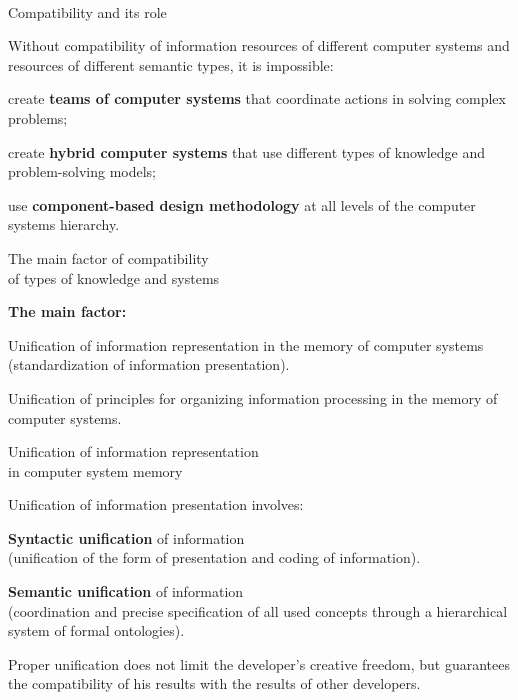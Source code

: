 \begin{frame}{\\Compatibility and its role}
	\topline
	\justifying
	
	Without compatibility of information resources of different computer systems and resources of different semantic types, it is impossible:
	\begin{textitemize}
		\item create \textbf{teams of computer systems} that coordinate actions in solving complex problems;
		\item create \textbf{hybrid computer systems} that use different types of knowledge and problem-solving models;
		\item use \textbf{component-based design methodology} at all levels of the computer systems hierarchy.
	\end{textitemize}
	
\end{frame}


\begin{frame}{The main factor of compatibility\\of types of knowledge and systems}
	\topline
	\justifying
	
	\textbf{The main factor:}
	\begin{textitemize}
		\item Unification of information representation in the memory of computer systems
		(standardization of information presentation).
		\item Unification of principles for organizing information processing in the memory of computer systems.
	\end{textitemize}
	
\end{frame}


\begin{frame}{Unification of information representation\\in computer system memory}
	\topline
	\justifying
	
	Unification of information presentation involves:
	\begin{textitemize}
		\item \textbf{Syntactic unification} of information\\
		(unification of the form of presentation and coding of information).
		\item \textbf{Semantic unification} of information\\
		(coordination and precise specification of all used concepts through a hierarchical system of formal ontologies).
	\end{textitemize}
	
	\medskip
	Proper unification does not limit the developer's creative freedom, but guarantees the compatibility of his results with the results of other developers.
	
\end{frame}


